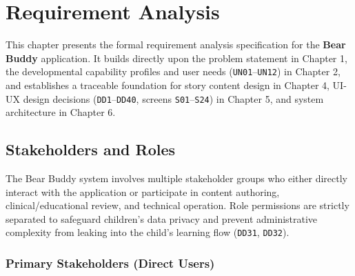 \chapter{Requirement Analysis}


This chapter presents the formal requirement analysis specification for the \textbf{Bear Buddy} application. It builds directly upon the problem statement in Chapter 1, the developmental capability profiles and user needs (\texttt{UN01}–\texttt{UN12}) in Chapter 2, and establishes a traceable foundation for story content design in Chapter 4, UI-UX design decisions (\texttt{DD1}–\texttt{DD40}, screens \texttt{S01}–\texttt{S24}) in Chapter 5, and system architecture in Chapter 6.


\section{Stakeholders and Roles}


The Bear Buddy system involves multiple stakeholder groups who either directly interact with the application or participate in content authoring, clinical/educational review, and technical operation. Role permissions are strictly separated to safeguard children's data privacy and prevent administrative complexity from leaking into the child's learning flow (\texttt{DD31}, \texttt{DD32}).


\subsection{Primary Stakeholders (Direct Users)}



